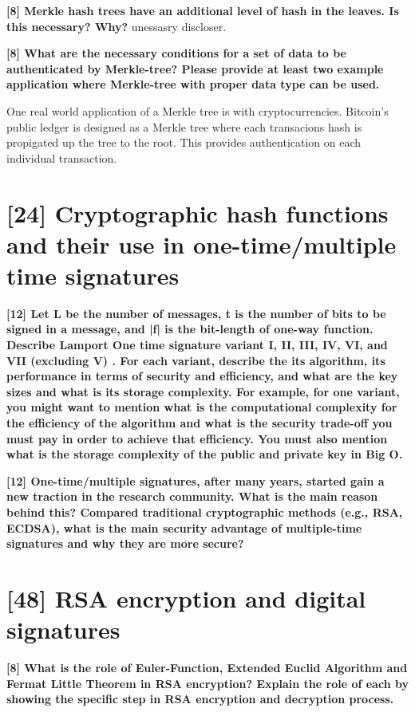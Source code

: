 \documentclass[letterpaper,11pt,notitlepage,fleqn]{article}
\begin{document}
\noindent \textbf{[8] Merkle hash trees have an additional level of hash in the leaves. Is this necessary? Why?}
unessasry discloser.

\noindent \textbf{[8] What are the necessary conditions for a set of data to be authenticated by Merkle-tree? Please provide at least two example application where Merkle-tree with proper data type can be used.}

One real world application of a Merkle tree is with cryptocurrencies. Bitcoin's public ledger is designed as a Merkle tree where each transacions hash is propigated up the tree to the root. This provides authentication on each individual transaction.

\section{[24] Cryptographic hash functions and their use in one-time/multiple time signatures}

\noindent \textbf{[12] Let L be the number of messages, t is the number of bits to be signed in a message, and |f| is the bit-length of one-way function. Describe Lamport One time signature variant I, II, III, IV, VI, and VII (excluding V) . For each variant, describe the its algorithm, its performance in terms of security and efficiency,  and what are the key sizes and what is its storage complexity. For example, for one variant, you might want to mention what is the computational complexity for the
efficiency  of the algorithm and what is the security trade-off you must pay in order to achieve that efficiency. You must also mention what is the storage complexity of the public and private key in Big O.}  
 

\noindent \textbf{[12] One-time/multiple signatures, after many years, started gain a new traction in  the  research  community.  What  is  the  main  reason  behind  this?  Compared traditional cryptographic methods  (e.g., RSA, ECDSA), what  is  the main security advantage of multiple-time signatures and why they are more secure?}  

\section{[48] RSA encryption and digital signatures}

\noindent \textbf{[8]  What  is  the  role  of  Euler-Function,  Extended  Euclid  Algorithm  and  Fermat Little  Theorem  in  RSA  encryption?  Explain  the  role  of  each  by  showing  the specific step in RSA encryption and decryption process.}  
\end{document}
